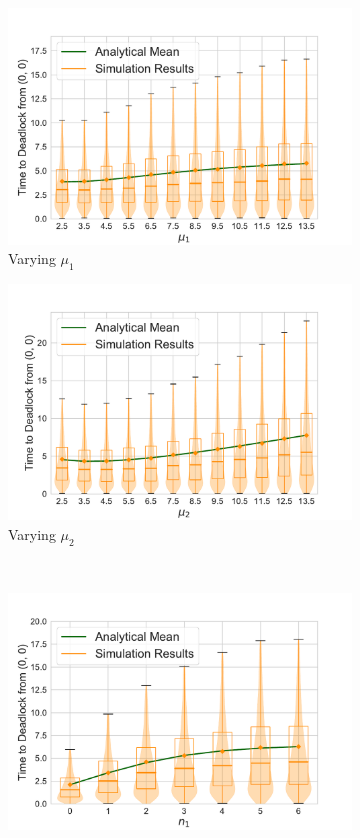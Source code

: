 \documentclass{article}
\numberwithin{equation}{section}
\begin{document}
\begin{figure}[!htbp]
\begin{center}
\begin{subfigure}[b]{0.48\textwidth}
  \includegraphics[width=\textwidth]{images/2Nmsfb_varymu1}
  \caption{Varying $\mu_1$}
  \label{fig:timestodeadlockfb_mu1}
\end{subfigure}
\begin{subfigure}[b]{0.48\textwidth}
  \includegraphics[width=\textwidth]{images/2Nmsfb_varymu2}
  \caption{Varying $\mu_2$}
  \label{fig:timestodeadlockfb_mu2}
\end{subfigure}\\
\begin{subfigure}[b]{0.48\textwidth}
  \includegraphics[width=\textwidth]{images/2Nmsfb_varyn1}

\end{subfigure}
\end{center}
\end{figure}
\end{document}
